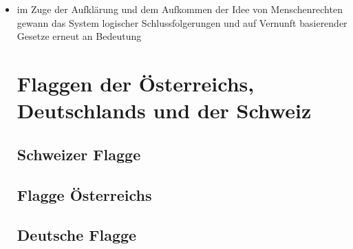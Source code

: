 \documentclass[11pt,a4paper]{article}
\begin{document}
\begin{itemize}
\item im Zuge der Aufklärung und dem Aufkommen der Idee von Menschenrechten gewann das System logischer Schlussfolgerungen und auf Vernunft basierender Gesetze erneut an Bedeutung



\section*{\textsf{Flaggen der Österreichs, Deutschlands und der Schweiz}}

\subsection*{Schweizer Flagge}


\subsection*{Flagge Österreichs}


\subsection*{Deutsche Flagge}







\end{itemize}
\end{document}
